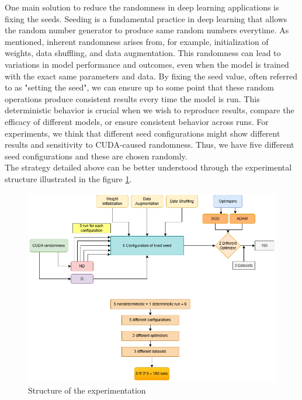 One main solution to reduce the randomness in deep learning applications is fixing the seeds.
Seeding is a fundamental practice in deep learning that allows the random number generator to produce same random numbers everytime. As mentioned, inherent randomness arises from, for example, initialization of weights, data shuffling, and data augmentation. This randomness can lead to variations in model performance and outcomes, even when the model is trained with the exact same parameters and data. By fixing the seed value, often referred to as "setting the seed", we can ensure up to some point that these random operations produce consistent results every time the model is run. This deterministic behavior is crucial when we wish to reproduce results, compare the efficacy of different models, or ensure consistent behavior across runs. 
For experiments, we think that different seed configurations might show different results and sensitivity
to CUDA-caused randomness. Thus, we have five different seed configurations and these are chosen randomly. \\

The strategy detailed above can be better understood through the experimental structure illustrated in the figure \ref{fig:runs_exp}.\\
      
\begin{figure}[htbp]
    \centerline{\includegraphics[scale=.5]{figures/runs.png}}
    \caption{Structure of the experimentation}
    \label{fig:runs_exp}
    \end{figure}
 
